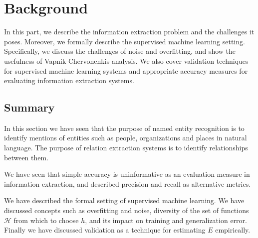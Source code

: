\chapter{Background}
\label{background}

In this part, we describe the information extraction problem and the challenges it poses. Moreover, we formally describe the supervised machine learning setting. Specifically, we discuss the challenges of noise and overfitting, and show the usefulness of Vapnik-Chervonenkis analysis. We also cover validation techniques for supervised machine learning systems and appropriate accuracy measures for evaluating information extraction systems.




\section{Summary}
In this section we have seen that the purpose of named entity recognition is to identify mentions of entities such as people, organizations and places in natural language. The purpose of relation extraction systems is to identify relationships between them. 

We have seen that simple accuracy is uninformative as an evaluation measure in information extraction, and described precision and recall as alternative metrics.

We have described the formal setting of supervised machine learning. We have discussed concepts such as overfitting and noise, diversity of the set of functions $\mathcal{H}$ from which to choose $h$, and its impact on training and generalization error. Finally we have discussed validation as a technique for estimating $E$ empirically.
